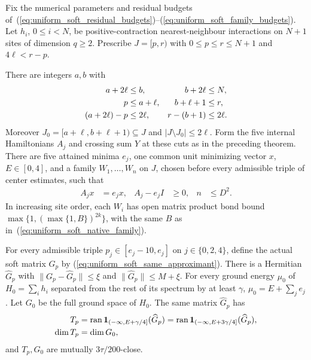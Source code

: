 \begin{lemma}
    \label{lem:uniform_long_interval_soft_improving_family}
    \leanok
    Fix the numerical parameters and residual budgets
    of~(\ref{eq:uniform_soft_residual_budgets})--(\ref{eq:uniform_soft_family_budgets}).
    Let $h_i$, $0\le i<N$, be positive-contraction nearest-neighbour
    interactions on $N+1$ sites of dimension $q\ge2$. Prescribe
    $J=[p,r)$ with $0\le p\le r\le N+1$ and $4\ell<r-p$.

    There are integers $a,b$ with
    \begin{align}
        a+2\ell     & \le b,      & b+2\ell  & \le N,\notag \\
        p           & \le a+\ell, & b+\ell+1 & \le r,\notag \\
        (a+2\ell)-p & \le2\ell,   & r-(b+1)  & \le2\ell.
        \label{eq:uniform_long_soft_middle_collars}
    \end{align}
    Moreover $J_0=[a+\ell,b+\ell+1)\subseteq J$ and
    $|J\setminus J_0|\le2\ell$.
    Form the five internal Hamiltonians $A_j$ and crossing sum $Y$
    at these cuts as in the preceding theorem. There are five attained
    minima $e_j$, one common unit minimizing vector $x$, $E\in[0,4]$,
    and a family $W_1,\ldots,W_n$ on $J$, chosen before every admissible
    triple of center estimates, such that
    \begin{align}
        A_jx & =e_jx, & A_j-e_jI & \ge0, & n & \le D^2.
    \end{align}
    In increasing site order, each $W_i$ has open matrix product bond
    bound $\max\{1,(\max\{1,B\})^{2k}\}$, with the same $B$ as
    in~(\ref{eq:uniform_soft_native_family}).

    For every admissible triple $p_j\in[e_j-10,e_j]$ on
    $j\in\{0,2,4\}$, define the actual soft matrix $G_p$ by
    (\ref{eq:uniform_soft_same_approximant}). There is a Hermitian
    $\widehat G_p$ with
    $\|G_p-\widehat G_p\|\le\xi$ and
    $\|\widehat G_p\|\le M+\xi$.
    For every ground energy $\mu_0$ of $H_0=\sum_i h_i$ separated
    from the rest of its spectrum by at least $\gamma$,
    $\mu_0=E+\sum_j e_j$. Let $G_0$ be the full ground space of $H_0$.
    The same matrix $\widehat G_p$ has
    \begin{align}
        T_p      & =\operatorname{ran}\mathbf1_{(-\infty,E+\gamma/4]}(\widehat G_p)
        =\operatorname{ran}\mathbf1_{(-\infty,E+3\gamma/4]}(\widehat G_p),\notag    \\
        \dim T_p & =\dim G_0,
    \end{align}
    and $T_p,G_0$ are mutually $3\tau/200$-close.


\end{lemma}
